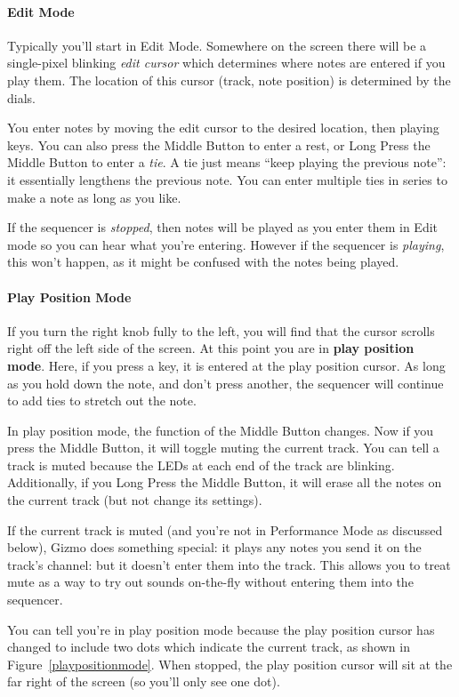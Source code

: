\documentclass{article}
\begin{document}
\paragraph{Edit Mode}
Typically you'll start in Edit Mode.  Somewhere on the screen there will be a single-pixel blinking {\it edit cursor} which determines where notes are entered if you play them.  The location of this cursor (track, note position) is determined by the dials.  

You enter notes by moving the edit cursor to the desired location, then playing keys.  You can also press the Middle Button to enter a rest, or Long Press the Middle Button to enter a {\it tie}.  A tie just means ``keep playing the previous note'': it essentially lengthens the previous note.  You can enter multiple ties in series to make a note as long as you like.

If the sequencer is {\it stopped}, then notes will be played as you enter them in Edit mode so you can hear what you're entering.  However if the sequencer is {\it playing}, this won't happen, as it might be confused with the notes being played.

\paragraph{Play Position Mode}

If you turn the right knob fully to the left, you will find that the cursor scrolls right off the left side of the screen.  At this point you are in {\bf play position mode}.  Here, if you press a key, it is entered at the play position cursor.  As long as you hold down the note, and don't press another, the sequencer will continue to add ties to stretch out the note.

In play position mode, the function of the Middle Button changes.  Now if you press the Middle Button, it will toggle muting the current track.  You can tell a track is muted because the LEDs at each end of the track are blinking.  Additionally, if you Long Press the Middle Button, it will erase all the notes on the current track (but not change its settings).

If the current track is muted (and you're not in Performance Mode as discussed below), Gizmo does something special: it plays any notes you send it on the track's channel: but it doesn't enter them into the track. This allows you to treat mute as a way to try out sounds on-the-fly without entering them into the sequencer.

You can tell you're in play position mode because the play position cursor has changed to include two dots which indicate the current track, as shown in Figure~\ref{playpositionmode}.  When stopped, the play position cursor will sit at the far right of the screen (so you'll only see one dot).
\end{document}
